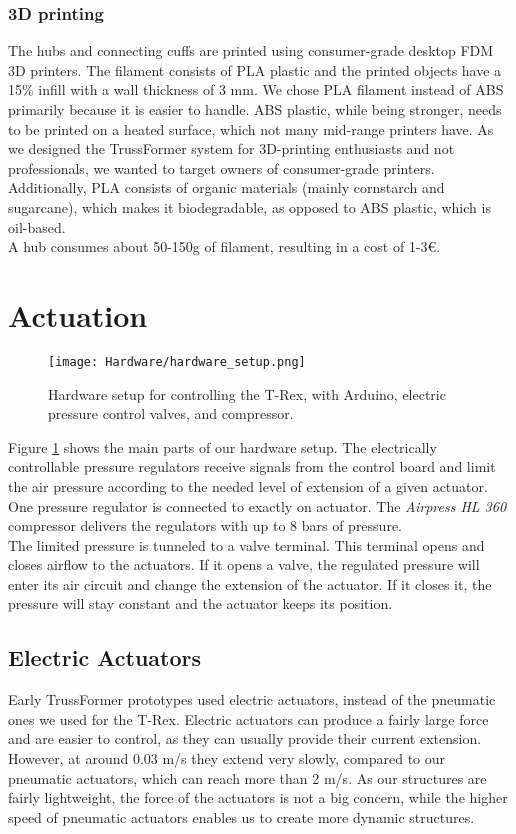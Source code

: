 \subsubsection{3D printing}
The hubs and connecting cuffs are printed using consumer-grade desktop \ac{FDM} 3D printers. The filament consists of \ac{PLA} plastic and the printed objects have a 15\% infill with a wall thickness of 3 mm. We chose PLA filament instead of \ac{ABS} primarily because it is easier to handle. ABS plastic, while being stronger, needs to be printed on a heated surface, which not many mid-range printers have. As we designed the TrussFormer system for 3D-printing enthusiasts and not professionals, we wanted to target owners of consumer-grade printers. Additionally, PLA consists of organic materials (mainly cornstarch and sugarcane), which makes it biodegradable, as opposed to ABS plastic, which is oil-based.\\
A hub consumes about 50-150g of filament, resulting in a cost of 1-3€.

\section{Actuation}
\begin{figure}[ht!]
    \texttt{[image: Hardware/hardware\_setup.png]}
    \centering
    \caption{Hardware setup for controlling the T-Rex, with Arduino, electric pressure control valves, and compressor.}
    \label{fig:hardware_setup}
\end{figure}
Figure \ref{fig:hardware_setup} shows the main parts of our hardware setup. The electrically controllable pressure regulators receive signals from the control board and limit the air pressure according to the needed level of extension of a given actuator. One pressure regulator is connected to exactly on actuator. The \textit{Airpress HL 360} compressor delivers the regulators with up to 8 bars of pressure.\\
The limited pressure is tunneled to a valve terminal. This terminal opens and closes airflow to the actuators. If it opens a valve, the regulated pressure will enter its air circuit and change the extension of the actuator. If it closes it, the pressure will stay constant and the actuator keeps its position.

\subsection{Electric Actuators}
Early TrussFormer prototypes used electric actuators, instead of the pneumatic ones we used for the T-Rex. Electric actuators can produce a fairly large force and are easier to control, as they can usually provide their current extension. However, at around 0.03 m/s they extend very slowly, compared to our pneumatic actuators, which can reach more than 2 m/s. As our structures are fairly lightweight, the force of the actuators is not a big concern, while the higher speed of pneumatic actuators enables us to create more dynamic structures.

